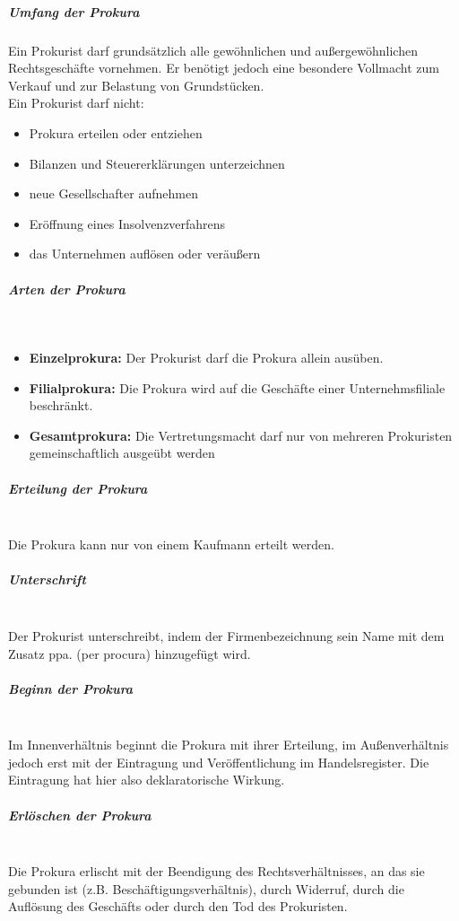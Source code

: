 	\subparagraph{Umfang der Prokura} Ein Prokurist darf grundsätzlich alle gewöhnlichen und außergewöhnlichen Rechtsgeschäfte vornehmen. Er benötigt jedoch eine besondere Vollmacht zum Verkauf und zur Belastung von Grundstücken.\\
	Ein Prokurist darf nicht:\\
	\begin{itemize}
		\item Prokura erteilen oder entziehen
		\item Bilanzen und Steuererklärungen unterzeichnen
		\item neue Gesellschafter aufnehmen
		\item Eröffnung eines Insolvenzverfahrens
		\item das Unternehmen auflösen oder veräußern
	\end{itemize}
	
	\subparagraph{Arten der Prokura}~\\
	\begin{itemize}
		\item {\bf Einzelprokura:} Der Prokurist darf die Prokura allein ausüben.
		\item {\bf Filialprokura:} Die Prokura wird auf die Geschäfte einer Unternehmsfiliale beschränkt.
		\item {\bf Gesamtprokura:} Die Vertretungsmacht darf nur von mehreren Prokuristen gemeinschaftlich ausgeübt werden
	\end{itemize}
	
	\subparagraph{Erteilung der Prokura}~\\
	Die Prokura kann nur von einem Kaufmann erteilt werden.\\
	
	\subparagraph{Unterschrift}~\\
	Der Prokurist unterschreibt, indem der Firmenbezeichnung sein Name mit dem Zusatz ppa. (per procura) hinzugefügt wird.\\
	
	\subparagraph{Beginn der Prokura}~\\
	Im Innenverhältnis beginnt die Prokura mit ihrer Erteilung, im Außenverhältnis jedoch erst mit der Eintragung und Veröffentlichung im Handelsregister. Die Eintragung hat hier also deklaratorische Wirkung.\\
	
	\subparagraph{Erlöschen der Prokura}~\\
	Die Prokura erlischt mit der Beendigung des Rechtsverhältnisses, an das sie gebunden ist (z.B. Beschäftigungsverhältnis), durch Widerruf, durch die Auflösung des Geschäfts oder durch den Tod des Prokuristen.
	
